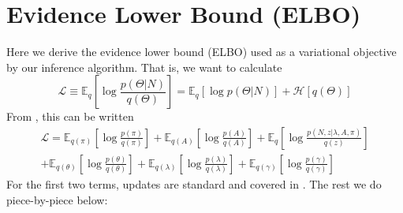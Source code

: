 \documentclass[10pt,letterpaper]{article}
\begin{document}
\section{Evidence Lower Bound (ELBO)}
Here we derive the evidence lower bound (ELBO) used as a variational objective by our inference algorithm. That is, we want to calculate
\begin{equation}
    \mathcal{L} \equiv \mathbb{E}_q \left[\log \frac{p(\Theta|N)}{q(\Theta)} \right] = \mathbb{E}_q \left[\log p(\Theta|N) \right] + \mathcal{H}[q(\Theta)]
\end{equation}
From \cite{beal2003variational}, this can be written
\begin{multline}
    \mathcal{L} = \mathbb{E}_{q(\pi)} \left[\log \frac{p(\pi)}{q(\pi)} \right]
    + \mathbb{E}_{q(A)} \left[\log \frac{p(A)}{q(A)} \right]
    + \mathbb{E}_{q}\left[ \log \frac{p(N, z|\lambda, A, \pi)}{q(z)}\right] \\
    + \mathbb{E}_{q(\theta)} \left[\log \frac{p(\theta)}{q(\theta)} \right]
    + \mathbb{E}_{q(\lambda)} \left[\log \frac{p(\lambda)}{q(\lambda)} \right]
    + \mathbb{E}_{q(\gamma)} \left[\log \frac{p(\gamma)}{q(\gamma)} \right]
\end{multline}
For the first two terms, updates are standard and covered in \cite{beal2003variational}. The rest we do piece-by-piece below:
\end{document}
